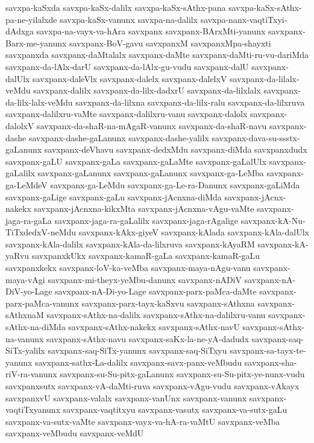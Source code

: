 {savxpa-kaSxda
savxpa-kaSx-dalilx
savxpa-kaSx-sAthx-pana
savxpa-kaSx-sAthx-pa-ne-yilalxde
savxpa-kaSx-vanunx
savxpa-na-dalilx
savxpa-nanx-vaqtiTxyi-dAdxga
savxpa-na-vayx-va-hAra
savxpanx
savxpanx-BArxMti-yanunx
savxpanx-Barx-me-yanunx
savxpanx-BoV-gavu
savxpanxM
savxpanxMpa-shayxti
savxpanxda
savxpanx-daMtalalx
savxpanx-daMte
savxpanx-daMti-ru-vu-dariMda
savxpanx-da-lAlx-darU
savxpanx-da-lAlx-gu-vudu
savxpanx-dalU
savxpanx-dalUlx
savxpanx-daleVlx
savxpanx-dalelx
savxpanx-dalelxV
savxpanx-da-lilalx-veMdu
savxpanx-dalilx
savxpanx-da-lilx-dadxrU
savxpanx-da-lilxlalx
savxpanx-da-lilx-lalx-veMdu
savxpanx-da-lilxna
savxpanx-da-lilx-ralu
savxpanx-da-lilxruva
savxpanx-dalilxru-vaMte
savxpanx-dalilxru-vanu
savxpanx-dalolx
savxpanx-dalolxV
savxpanx-da-shaR-na-mAgaR-vanunx
savxpanx-da-shaR-navu
savxpanx-dashe
savxpanx-dashe-gaLanunx
savxpanx-dashe-yalilx
savxpanx-dava-su-ssstx-gaLanunx
savxpanx-deVhavu
savxpanx-dedxMdu
savxpanx-diMda
savxpanxdudx
savxpanx-gaLU
savxpanx-gaLa
savxpanx-gaLaMte
savxpanx-gaLalUlx
savxpanx-gaLalilx
savxpanx-gaLanunx
savxpanx-gaLanunx
savxpanx-ga-LeMba
savxpanx-ga-LeMdeV
savxpanx-ga-LeMdu
savxpanx-ga-Le-ra-Danunx
savxpanx-gaLiMda
savxpanx-gaLige
savxpanx-gaLu
savxpanx-jAcnxna-diMda
savxpanx-jAcnx-nakekx
savxpanx-jAcnxna-kikxMta
savxpanx-jAcnxna-vAgu-vaMte
savxpanx-jaga-ra-gaLa
savxpanx-jaga-ra-gaLalilx
savxpanx-jaga-rAgalige
savxpanx-kA-Nu-TiTxdedxV-neMdu
savxpanx-kAkx-giyeV
savxpanx-kAlada
savxpanx-kAla-dalUlx
savxpanx-kAla-dalilx
savxpanx-kAla-da-lilxruva
savxpanx-kAyaRM
savxpanx-kA-yaRvu
savxpanxkUkx
savxpanx-kamaR-gaLa
savxpanx-kamaR-gaLu
savxpanxkekx
savxpanx-loV-ka-veMba
savxpanx-maya-nAgu-vanu
savxpanx-maya-vAgi
savxpanx-mi-theyx-yeMbu-danunx
savxpanx-nADiV
savxpanx-nA-DiV-yo-Lage
savxpanx-nA-Di-yo-Lage
savxpanx-parx-paMca-daMte
savxpanx-parx-paMca-vanunx
savxpanx-parx-tayx-kaSxvu
savxpanx-sAthxna
savxpanx-sAthxnaM
savxpanx-sAthx-na-dalilx
savxpanx-sAthx-na-dalilxru-vanu
savxpanx-sAthx-na-diMda
savxpanx-sAthx-nakekx
savxpanx-sAthx-navU
savxpanx-sAthx-na-vanunx
savxpanx-sAthx-navu
savxpanx-saKx-la-ne-yA-dadudx
savxpanx-saq-SiTx-yalilx
savxpanx-saq-SiTx-yanunx
savxpanx-saq-SiTxyu
savxpanx-sa-tayx-te-yanunx
savxpanx-sathx-La-dalilx
savxpanx-savx-panx-veMbudu
savxpanx-sha-riV-ra-vanunx
savxpanx-su-Su-pitx-gaLanunx
savxpanx-su-Su-pitx-ye-nunx-vudu
savxpanxsutx
savxpanx-vA-daMti-ruva
savxpanx-vAgu-vudu
savxpanx-vAkayx
savxpanxvU
savxpanx-valalx
savxpanx-vanUnx
savxpanx-vanunx
savxpanx-vaqtiTxyanunx
savxpanx-vaqtitxyu
savxpanx-vasutx
savxpanx-va-sutx-gaLu
savxpanx-va-sutx-vaMte
savxpanx-vayx-va-hA-ra-vaMtU
savxpanx-veMba
savxpanx-veMbudu
savxpanx-veMdU
}
